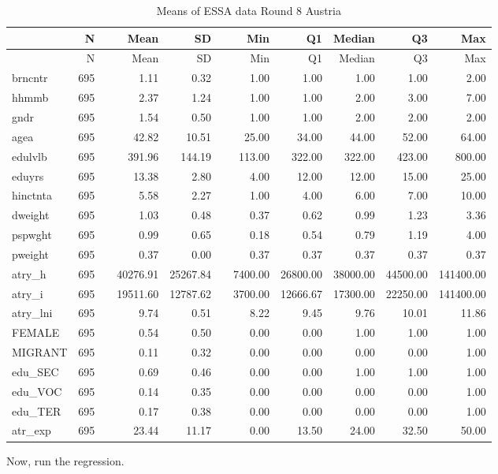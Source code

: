 \documentclass[]{article}
\begin{document}
\begin{longtable}[]{@{}lrlrrlrrrrr@{}}
\caption{Means of ESSA data Round 8 Austria}\tabularnewline
\toprule
& N & & Mean & SD & & Min & Q1 & Median & Q3 & Max\tabularnewline
\midrule
\endfirsthead
\toprule
& N & & Mean & SD & & Min & Q1 & Median & Q3 & Max\tabularnewline
\midrule
\endhead
brncntr & 695 & & 1.11 & 0.32 & & 1.00 & 1.00 & 1.00 & 1.00 &
2.00\tabularnewline
hhmmb & 695 & & 2.37 & 1.24 & & 1.00 & 1.00 & 2.00 & 3.00 &
7.00\tabularnewline
gndr & 695 & & 1.54 & 0.50 & & 1.00 & 1.00 & 2.00 & 2.00 &
2.00\tabularnewline
agea & 695 & & 42.82 & 10.51 & & 25.00 & 34.00 & 44.00 & 52.00 &
64.00\tabularnewline
edulvlb & 695 & & 391.96 & 144.19 & & 113.00 & 322.00 & 322.00 & 423.00
& 800.00\tabularnewline
eduyrs & 695 & & 13.38 & 2.80 & & 4.00 & 12.00 & 12.00 & 15.00 &
25.00\tabularnewline
hinctnta & 695 & & 5.58 & 2.27 & & 1.00 & 4.00 & 6.00 & 7.00 &
10.00\tabularnewline
dweight & 695 & & 1.03 & 0.48 & & 0.37 & 0.62 & 0.99 & 1.23 &
3.36\tabularnewline
pspwght & 695 & & 0.99 & 0.65 & & 0.18 & 0.54 & 0.79 & 1.19 &
4.00\tabularnewline
pweight & 695 & & 0.37 & 0.00 & & 0.37 & 0.37 & 0.37 & 0.37 &
0.37\tabularnewline
atry\_h & 695 & & 40276.91 & 25267.84 & & 7400.00 & 26800.00 & 38000.00
& 44500.00 & 141400.00\tabularnewline
atry\_i & 695 & & 19511.60 & 12787.62 & & 3700.00 & 12666.67 & 17300.00
& 22250.00 & 141400.00\tabularnewline
atry\_lni & 695 & & 9.74 & 0.51 & & 8.22 & 9.45 & 9.76 & 10.01 &
11.86\tabularnewline
FEMALE & 695 & & 0.54 & 0.50 & & 0.00 & 0.00 & 1.00 & 1.00 &
1.00\tabularnewline
MIGRANT & 695 & & 0.11 & 0.32 & & 0.00 & 0.00 & 0.00 & 0.00 &
1.00\tabularnewline
edu\_SEC & 695 & & 0.69 & 0.46 & & 0.00 & 0.00 & 1.00 & 1.00 &
1.00\tabularnewline
edu\_VOC & 695 & & 0.14 & 0.35 & & 0.00 & 0.00 & 0.00 & 0.00 &
1.00\tabularnewline
edu\_TER & 695 & & 0.17 & 0.38 & & 0.00 & 0.00 & 0.00 & 0.00 &
1.00\tabularnewline
atr\_exp & 695 & & 23.44 & 11.17 & & 0.00 & 13.50 & 24.00 & 32.50 &
50.00\tabularnewline
\bottomrule
\end{longtable}

Now, run the regression.
\end{document}
